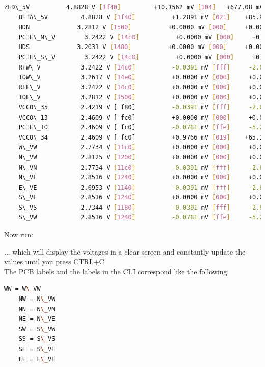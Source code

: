 \begin{lstlisting}[language=bash,morekeywords=$,keywordstyle=\bfseries,frame=none,xleftmargin=.25in,belowskip=2em, aboveskip=2em]
    ZED\_5V          4.8828 V [1f40]         +10.1562 mV [104]   +677.08 mA
    BETA\_5V         4.8828 V [1f40]          +1.2891 mV [021]    +85.94 mA
    HDN             3.2812 V [1500]          +0.0000 mV [000]     +0.00 mA
    PCIE\_N\_V        3.2422 V [14c0]          +0.0000 mV [000]     +0.00 mA
    HDS             3.2031 V [1480]          +0.0000 mV [000]     +0.00 mA
    PCIE\_S\_V        3.2422 V [14c0]          +0.0000 mV [000]     +0.00 mA
    RFW\_V           3.2422 V [14c0]          -0.0391 mV [fff]     -2.60 mA
    IOW\_V           3.2617 V [14e0]          +0.0000 mV [000]     +0.00 mA
    RFE\_V           3.2422 V [14c0]          +0.0000 mV [000]     +0.00 mA
    IOE\_V           3.2812 V [1500]          +0.0000 mV [000]     +0.00 mA
    VCCO\_35         2.4219 V [ f80]          -0.0391 mV [fff]     -2.60 mA
    VCCO\_13         2.4609 V [ fc0]          +0.0000 mV [000]     +0.00 mA
    PCIE\_IO         2.4609 V [ fc0]          -0.0781 mV [ffe]     -5.21 mA
    VCCO\_34         2.4609 V [ fc0]          +0.9766 mV [019]    +65.10 mA
    W\_VW            2.7734 V [11c0]          +0.0000 mV [000]     +0.00 mA
    N\_VW            2.8125 V [1200]          +0.0000 mV [000]     +0.00 mA
    N\_VN            2.7734 V [11c0]          -0.0391 mV [fff]     -2.60 mA
    N\_VE            2.8516 V [1240]          +0.0000 mV [000]     +0.00 mA
    E\_VE            2.6953 V [1140]          -0.0391 mV [fff]     -2.60 mA
    S\_VE            2.8516 V [1240]          +0.0000 mV [000]     +0.00 mA
    S\_VS            2.7344 V [1180]          -0.0391 mV [fff]     -2.60 mA
    S\_VW            2.8516 V [1240]          -0.0781 mV [ffe]     -5.21 mA
\end{lstlisting}

Now run: \\


... which will display the voltages in a clear screen and constantly update the values until you press CTRL+C.\\

The PCB labels and the labels in the CLI correspond like the following: 

\begin{lstlisting}[language=bash,morekeywords=$,keywordstyle=\bfseries,frame=none,xleftmargin=.25in,belowskip=2em, aboveskip=2em]
    WW = W\_VW
    NW = N\_VW
    NN = N\_VN
    NE = N\_VE
    SW = S\_VW
    SS = S\_VS
    SE = S\_VE
    EE = E\_VE
\end{lstlisting}

